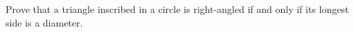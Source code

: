 Prove that a triangle inscribed in a circle is right-angled if and only if its longest side is a diameter.
